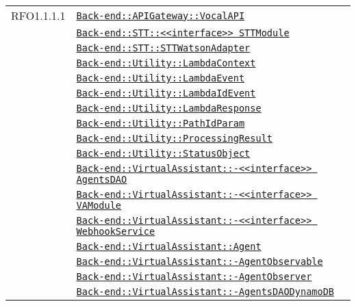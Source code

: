 \begin{longtable}{|>{\centering}m{3cm}|m{10cm}<{\centering}|}
RFO1.1.1.1 & \hyperref[Back-end::APIGateway::VocalAPI]{\texttt{Back-end::APIGateway::VocalAPI}}\\
& \hyperref[Back-end::STT::<<interface>> STTModule]{\texttt{Back-end::STT::<<interface>> STTModule}}\\
& \hyperref[Back-end::STT::STTWatsonAdapter]{\texttt{Back-end::STT::STTWatsonAdapter}}\\
& \hyperref[Back-end::Utility::LambdaContext]{\texttt{Back-end::Utility::LambdaContext}}\\
& \hyperref[Back-end::Utility::LambdaEvent]{\texttt{Back-end::Utility::LambdaEvent}}\\
& \hyperref[Back-end::Utility::LambdaIdEvent]{\texttt{Back-end::Utility::LambdaIdEvent}}\\
& \hyperref[Back-end::Utility::LambdaResponse]{\texttt{Back-end::Utility::LambdaResponse}}\\
& \hyperref[Back-end::Utility::PathIdParam]{\texttt{Back-end::Utility::PathIdParam}}\\
& \hyperref[Back-end::Utility::ProcessingResult]{\texttt{Back-end::Utility::ProcessingResult}}\\
& \hyperref[Back-end::Utility::StatusObject]{\texttt{Back-end::Utility::StatusObject}}\\
& \hyperref[Back-end::VirtualAssistant::<<interface>> AgentsDAO]{\texttt{Back-end::VirtualAssistant::-\linebreak <<interface>> AgentsDAO}}\\
& \hyperref[Back-end::VirtualAssistant::<<interface>> VAModule]{\texttt{Back-end::VirtualAssistant::-\linebreak <<interface>> VAModule}}\\
& \hyperref[Back-end::VirtualAssistant::<<interface>> WebhookService]{\texttt{Back-end::VirtualAssistant::-\linebreak <<interface>> WebhookService}}\\
& \hyperref[Back-end::VirtualAssistant::Agent]{\texttt{Back-end::VirtualAssistant::Agent}}\\
& \hyperref[Back-end::VirtualAssistant::AgentObservable]{\texttt{Back-end::VirtualAssistant::-\linebreak AgentObservable}}\\
& \hyperref[Back-end::VirtualAssistant::AgentObserver]{\texttt{Back-end::VirtualAssistant::-\linebreak AgentObserver}}\\
& \hyperref[Back-end::VirtualAssistant::AgentsDAODynamoDB]{\texttt{Back-end::VirtualAssistant::-\linebreak AgentsDAODynamoDB}}\\

\end{longtable}
